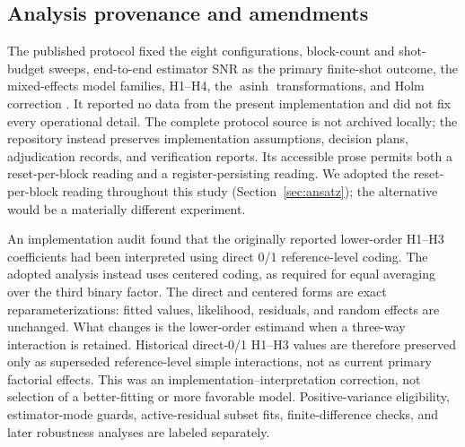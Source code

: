 \documentclass[pdflatex,sn-mathphys-num,Numbered]{sn-jnl}
\begin{document}
\subsection{Analysis provenance and amendments}\label{sec:provenance}

The published protocol fixed the eight configurations, block-count and shot-budget sweeps, end-to-end estimator SNR as the primary finite-shot outcome, the mixed-effects model families, H1--H4, the $\operatorname{asinh}$ transformations, and Holm correction \cite{shen2026gradient}. It reported no data from the present implementation and did not fix every operational detail. The complete protocol source is not archived locally; the repository instead preserves implementation assumptions, decision plans, adjudication records, and verification reports. Its accessible prose permits both a reset-per-block reading and a register-persisting reading. We adopted the reset-per-block reading throughout this study (Section~\ref{sec:ansatz}); the alternative would be a materially different experiment.

An implementation audit found that the originally reported lower-order H1--H3 coefficients had been interpreted using direct 0/1 reference-level coding. The adopted analysis instead uses centered coding, as required for equal averaging over the third binary factor. The direct and centered forms are exact reparameterizations: fitted values, likelihood, residuals, and random effects are unchanged. What changes is the lower-order estimand when a three-way interaction is retained. Historical direct-0/1 H1--H3 values are therefore preserved only as superseded reference-level simple interactions, not as current primary factorial effects. This was an implementation--interpretation correction, not selection of a better-fitting or more favorable model. Positive-variance eligibility, estimator-mode guards, active-residual subset fits, finite-difference checks, and later robustness analyses are labeled separately.
\end{document}
